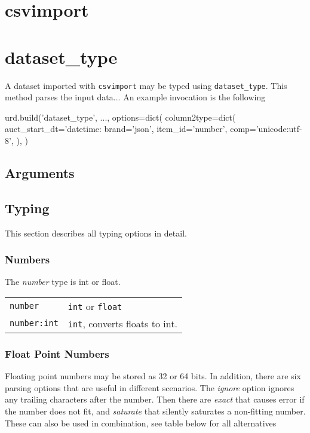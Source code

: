 \section{csvimport}




\clearpage
\section{dataset\_type}

A dataset imported with \texttt{csvimport} may be typed using
\texttt{dataset\_type}.  This method parses the input data...
An example invocation is the following

\begin{python}
urd.build('dataset_type', ...,
  options=dict(
    column2type=dict(
      auct_start_dt='datetime:%
      brand='json',
      item_id='number',
      comp='unicode:utf-8',
    ),
  )
\end{python}


\subsection{Arguments}


\subsection{Typing}
This section describes all typing options in detail.

\subsubsection{Numbers}
The \emph{number} type is int or float.

\begin{tabular}{ll}
  \texttt{number}     & \texttt{int} or \texttt{float}\\
  \texttt{number:int} & \texttt{int}, converts floats to int.\\
\end{tabular}



\subsubsection{Float Point Numbers}
Floating point numbers may be stored as 32 or 64 bits.  In addition,
there are six parsing options that are useful in different scenarios.
The \emph{ignore} option ignores any trailing characters after the
number.  Then there are \emph{exact} that causes error if the number
does not fit, and \emph{saturate} that silently saturates a
non-fitting number.  These can also be used in combination, see table
below for all alternatives\\

